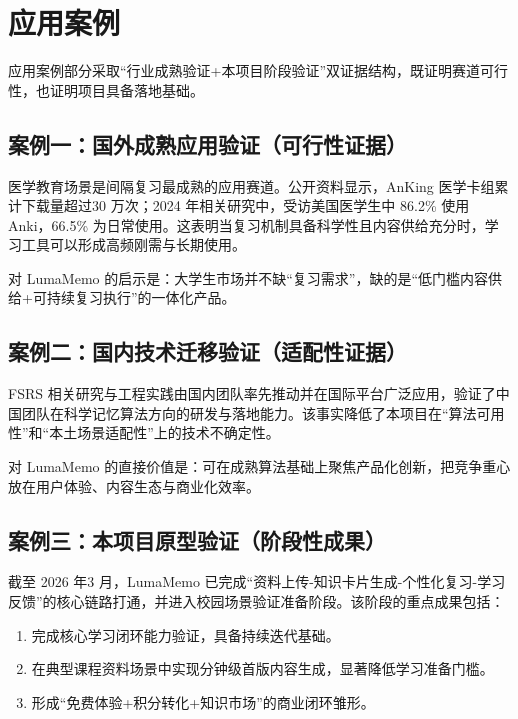 \section{应用案例}

应用案例部分采取“行业成熟验证+本项目阶段验证”双证据结构，既证明赛道可行性，也证明项目具备落地基础。

\subsection{案例一：国外成熟应用验证（可行性证据）}

医学教育场景是间隔复习最成熟的应用赛道。公开资料显示，AnKing 医学卡组累计下载量超过30 万次；2024 年相关研究中，受访美国医学生中 86.2\% 使用 Anki，66.5\% 为日常使用。这表明当复习机制具备科学性且内容供给充分时，学习工具可以形成高频刚需与长期使用。

对 LumaMemo 的启示是：大学生市场并不缺“复习需求”，缺的是“低门槛内容供给+可持续复习执行”的一体化产品。

\subsection{案例二：国内技术迁移验证（适配性证据）}

FSRS 相关研究与工程实践由国内团队率先推动并在国际平台广泛应用，验证了中国团队在科学记忆算法方向的研发与落地能力。该事实降低了本项目在“算法可用性”和“本土场景适配性”上的技术不确定性。

对 LumaMemo 的直接价值是：可在成熟算法基础上聚焦产品化创新，把竞争重心放在用户体验、内容生态与商业化效率。

\subsection{案例三：本项目原型验证（阶段性成果）}

截至 2026 年3 月，LumaMemo 已完成“资料上传-知识卡片生成-个性化复习-学习反馈”的核心链路打通，并进入校园场景验证准备阶段。该阶段的重点成果包括：

\begin{enumerate}[leftmargin=2em]
	\item 完成核心学习闭环能力验证，具备持续迭代基础。
	\item 在典型课程资料场景中实现分钟级首版内容生成，显著降低学习准备门槛。
	\item 形成“免费体验+积分转化+知识市场”的商业闭环雏形。
\end{enumerate}

